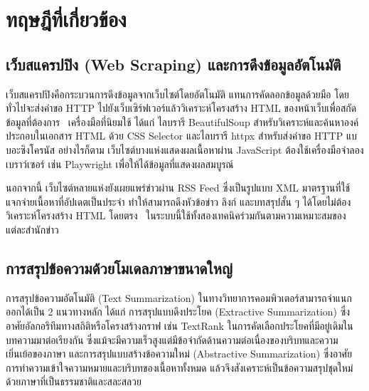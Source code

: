 
\section{ทฤษฎีที่เกี่ยวข้อง}

\subsection{เว็บสแครปปิง (Web Scraping) และการดึงข้อมูลอัตโนมัติ}

เว็บสแครปปิงคือกระบวนการดึงข้อมูลจากเว็บไซต์โดยอัตโนมัติ แทนการคัดลอกข้อมูลด้วยมือ โดยทั่วไปจะส่งคำขอ HTTP ไปยังเว็บเซิร์ฟเวอร์แล้ววิเคราะห์โครงสร้าง HTML ของหน้าเว็บเพื่อสกัดข้อมูลที่ต้องการ~\parencite{barbaresi-2021-trafilatura} เครื่องมือที่นิยมใช้ ได้แก่ ไลบรารี BeautifulSoup สำหรับวิเคราะห์และค้นหาองค์ประกอบในเอกสาร HTML ด้วย CSS Selector และไลบรารี httpx สำหรับส่งคำขอ HTTP แบบอะซิงโครนัส อย่างไรก็ตาม เว็บไซต์บางแห่งแสดงผลเนื้อหาผ่าน JavaScript ต้องใช้เครื่องมือจำลองเบราว์เซอร์ เช่น Playwright เพื่อให้ได้ข้อมูลที่แสดงผลสมบูรณ์

นอกจากนี้ เว็บไซต์หลายแห่งยังเผยแพร่ข่าวผ่าน RSS Feed ซึ่งเป็นรูปแบบ XML มาตรฐานที่ใช้แจกจ่ายเนื้อหาที่อัปเดตเป็นประจำ ทำให้สามารถดึงหัวข้อข่าว ลิงก์ และบทสรุปสั้น ๆ ได้โดยไม่ต้องวิเคราะห์โครงสร้าง HTML โดยตรง~\parencite{rss2009} ในระบบนี้ใช้ทั้งสองเทคนิคร่วมกันตามความเหมาะสมของแต่ละสำนักข่าว

\subsection{การสรุปข้อความด้วยโมเดลภาษาขนาดใหญ่}

การสรุปข้อความอัตโนมัติ (Text Summarization) ในทางวิทยาการคอมพิวเตอร์สามารถจำแนกออกได้เป็น 2 แนวทางหลัก ได้แก่ การสรุปแบบดึงประโยค (Extractive Summarization) ซึ่งอาศัยอัลกอริทึมทางสถิติหรือโครงสร้างกราฟ เช่น TextRank ในการคัดเลือกประโยคที่มีอยู่เดิมในบทความมาต่อเรียงกัน ซึ่งแม้จะมีความเร็วสูงแต่มีข้อจำกัดด้านความต่อเนื่องของบริบทและความเยิ่นเย้อของภาษา และการสรุปแบบสร้างข้อความใหม่ (Abstractive Summarization) ซึ่งอาศัยการทำความเข้าใจความหมายและบริบทของเนื้อหาทั้งหมด แล้วจึงสังเคราะห์เป็นข้อความสรุปชุดใหม่ด้วยภาษาที่เป็นธรรมชาติและสละสลวย~\parencite{allahyari2017}

